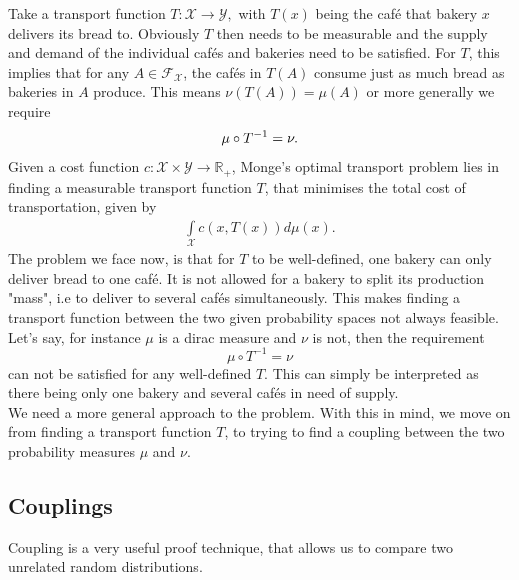 \documentclass[11pt,a4paper]{article}
\begin{document}
Take a transport function $T:\mathcal{X}\rightarrow\mathcal{Y},$ with $T(x)$ being the café that bakery $x$ delivers its bread to. Obviously $T$ then needs to be measurable and the supply and demand of the individual cafés and bakeries need to be satisfied. For $T$, this implies that for any $A\in\mathcal{F_X}$, the cafés in $T(A)$ consume just as much bread as bakeries in $A$ produce. This means $\nu(T(A))=\mu(A)$ or more generally we require 
\[
\mu\circ{}T^{-1}=\nu.
\vspace{1em}\\
\]
Given a cost function $c:\mathcal{X\times{}Y}\rightarrow\mathbb{R}_{+}$, Monge's optimal transport problem lies in finding a measurable transport function $T$, that minimises the total cost of transportation, given by 
\begin{align*}
\int\limits_{\mathcal{X}}c(x,T(x))d\mu(x).
\end{align*} 
The problem we face now, is that for $T$ to be well-defined, one bakery can only deliver bread to one café. It is not allowed for a bakery to split its production "mass", i.e to deliver to several cafés simultaneously. This makes finding a transport function between the two given probability spaces not always feasible.\vspace{1em}\\Let's say, for instance $\mu$ is a dirac measure and $\nu$ is not, then the requirement
\[
\mu\circ{}T^{-1}=\nu
\]
can not be satisfied for any well-defined $T$. This can simply be interpreted as there being only one bakery and several cafés in need of supply.\vspace{1em}\\
We need a more general approach to the problem. With this in mind, we move on from finding a transport function $T$, to trying to find a coupling between the two probability measures $\mu$ and $\nu$.
\subsection{Couplings}
Coupling is a very useful proof technique, that allows us to compare two unrelated random distributions.
\end{document}
